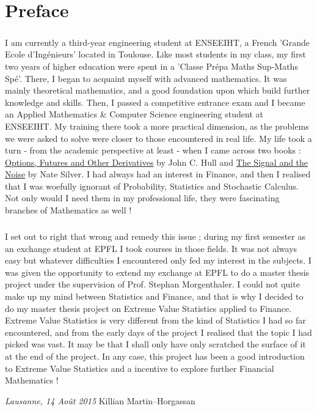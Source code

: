 \chapter*{Preface}

\bigskip
\paragraph{}
I am currently a third-year engineering student at ENSEEIHT, a French 'Grande Ecole d'Ingénieurs' located in Toulouse. Like most students in my class, my first two years of higher education were spent in a 'Classe Prépa Maths Sup-Maths Spé'. There, I began to acquaint myself with advanced mathematics. It was mainly theoretical mathematics, and a good foundation upon which build further knowledge and skills. \newline Then, I passed a competitive entrance exam and I became an Applied Mathematics \& Computer Science  engineering student at ENSEEIHT. My training there took a more practical dimension, as the problems we were asked to solve were closer to those encountered in real life. My life took a turn - from the academic perspective at least - when I came across two books : \underline{Options, Futures and Other Derivatives} by John C. Hull and \underline{The Signal and the Noise} by Nate Silver. I had always had an interest in Finance, and then I realised that I was woefully ignorant of Probability, Statistics and Stochastic Calculus. Not only would I need them in my professional life, they were fascinating branches of Mathematics as well !
\paragraph{}
I set out to right that wrong and remedy this issue ; during my first semester as an exchange student at EPFL I took courses in those fields. It was not always easy but whatever difficulties I encountered only fed my interest in the subjects. I was given the opportunity to extend my exchange at EPFL to do a master thesis project under the supervision of Prof. Stephan Morgenthaler. I could not quite make up my mind between Statistics and Finance, and that is why I decided to do my master thesis project on Extreme Value Statistics applied to Finance. Extreme Value Statistics is very different from the kind of Statistics I had so far encountered, and from the early days of the project I realised that the topic I had picked was vast. It may be that I shall only have only scratched the surface of it at the end of the project. In any case, this project has been a good introduction to Extreme Value Statistics and a incentive to explore further Financial Mathematics !




\bigskip
 
\noindent\textit{Lausanne, 14 Ao\^{u}t 2015}
\hfill Killian Martin--Horgassan

